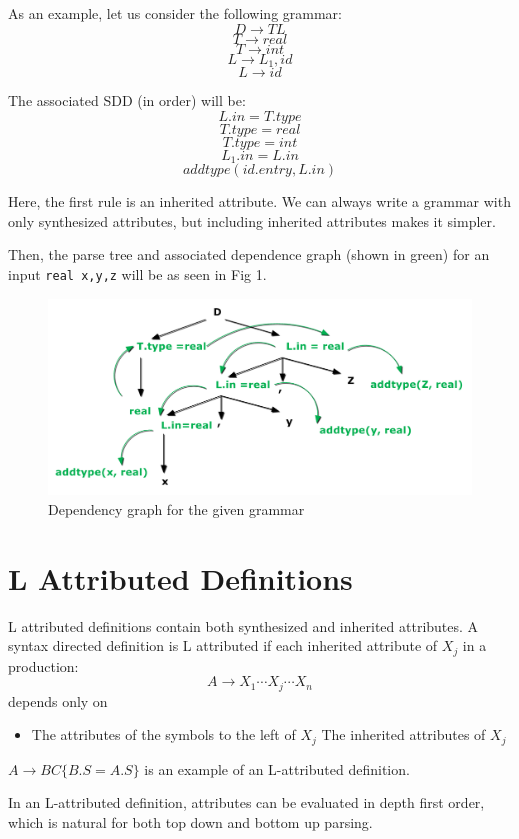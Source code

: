 \documentclass[12pt,letterpaper]{book}
\theoremstyle{definition}
\begin{document}
As an example, let us consider the following grammar:
\[D \rightarrow TL\]
\[T \rightarrow real\]
\[T \rightarrow int\]
\[L \rightarrow L_1,id\]
\[L \rightarrow id\]

The associated SDD (in order) will be:
\[L.in = T.type\]
\[T.type = real\]
\[T.type = int\]
\[L_1.in = L.in\]
\[addtype(id.entry,L.in)\]

Here, the first rule is an inherited attribute. We can always write a grammar with only synthesized attributes, but including inherited attributes makes it simpler.

Then, the parse tree and associated dependence graph (shown in green) for an input \texttt{real x,y,z} will be as seen in Fig 1.

\begin{figure}[htpb]
  \centering
  \includegraphics[width=0.8\linewidth]{./assets/dep_graph_eg.png}
  \caption{Dependency graph for the given grammar}%
  \label{fig:}
\end{figure}

\section{L Attributed Definitions}

L attributed definitions contain both synthesized and inherited attributes. A syntax directed definition is L attributed if each inherited attribute of $X_j$ in a production:
\[A \rightarrow X_1 \cdots X_j \cdots X_n\]
depends only on
\begin{itemize}
  \item The attributes of the symbols to the left of $X_j$
    \irem The inherited attributes of $X_j$
\end{itemize}

$A \rightarrow BC \{B.S = A.S\}$ is an example of an L-attributed definition.

In an L-attributed definition, attributes can be evaluated in depth first order, which is natural for both top down and bottom up parsing.
\end{document}
